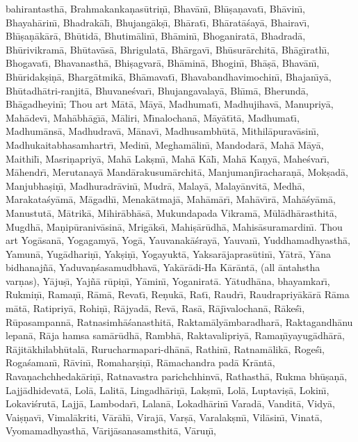 bahirantasth\=a, Brahmakanka\d{n}as\=utri\d{n}\={\i}, Bhav\=an\={\i}, Bh\={\i}\d{s}a\d{n}avat\={\i}, Bh\=avin\={\i}, Bhayah\=arin\={\i}, Bhadrak\=al\={\i}, Bhujang\=ak\d{s}\={\i}, Bh\=arat\={\i}, Bh\=arat\=a\'say\=a, Bhairav\={\i}, Bh\={\i}\d{s}a\d{n}\=ak\=ar\=a, Bh\=utid\=a, Bhutim\=alin\={\i}, Bh\=amin\={\i}, Bhoganirat\=a, Bhadrad\=a, Bh\=urivikram\=a, Bh\=utav\=as\=a, Bhrigulat\=a, Bh\=argav\={\i}, Bh\=usur\=archit\=a, Bh\=ag\={\i}rath\={\i}, Bhogavat\={\i}, Bhavanasth\=a, Bhi\d{s}agvar\=a, Bh\=amin\=a, Bhogin\={\i}, Bh\=a\d{s}\=a, Bhav\=an\={\i}, Bh\=uridak\d{s}i\d{n}\=a, Bharg\=atmik\=a, Bh\=amavat\={\i}, Bhavabandhavimochin\={\i}, Bhajan\={\i}y\=a, Bh\=utadh\=atri-ranjit\=a, Bhuvane\'svar\={\i}, Bhujangavalay\=a, Bh\={\i}m\=a, Bherund\=a, Bh\=agadheyin\={\i}; Thou art M\=at\=a, M\=ay\=a, Madhumat\={\i}, Madhujihav\=a, Manupriy\=a, Mah\=adev\={\i}, Mah\=abh\=ag\={\i}\=a, M\=aliri, M\={\i}nalochan\=a, M\=ay\=at\={\i}t\=a, Madhumat\={\i}, Madhum\=ans\=a, Madhudrav\=a, M\=anav\={\i}, Madhusambh\=ut\=a, Mithil\=apurav\=asin\={\i}, Madhukaitabhasamhartr\={\i}, Medin\={\i}, Megham\=alin\={\i}, Mandodar\=a, Mah\=a M\=ay\=a, Maithil\={\i}, Masri\d{n}apriy\=a, Mah\=a Lak\d{s}m\={\i}, Mah\=a K\=al\={\i}, Mah\=a Ka\d{n}y\=a, Mahe\'svar\={\i}, M\=ahendr\={\i}, Merutanay\=a Mand\=arakusum\=archit\=a, Manjumanj\={\i}rachara\d{n}\=a, Mok\d{s}ad\=a, Manjubha\d{s}i\d{n}\={\i}, Madhuradr\=avin\={\i}, Mudr\=a, Malay\=a, Malay\=anvit\=a, Medh\=a, Marakata\'sy\=am\=a, M\=agadh\={\i}, Menak\=atmaj\=a, Mah\=am\=ar\={\i}, Mah\=av\={\i}r\=a, Mah\=a\'sy\=am\=a, Manustut\=a, M\=atrik\=a, Mihir\=abh\=as\=a, Mukundapada Vikram\=a, M\=ul\=adh\=arasthit\=a, Mugdh\=a, Ma\d{n}ip\=uraniv\=asin\=a, Mrig\=aks\={\i}, Mahi\d{s}\=ar\=udh\=a, Mahis\=asuramardin\={\i}. Thou art Yog\=asan\=a, Yogagamy\=a, Yog\=a, Yauvanak\=a\'sray\=a, Yauvan\={\i}, Yuddhamadhyasth\=a, Yamun\=a, Yug\=adhari\d{n}\={\i}, Yak\d{s}i\d{n}\={\i}, Yogayukt\=a, Yaksar\=ajapras\=utin\={\i}, Y\=atr\=a, Y\=ana bidhanaj\~n\=a, Yaduva\d{n}\'sasamudbhav\=a, Yak\=ar\=adi-Ha K\=ar\=ant\=a, (all \=antahstha var\d{n}as), Y\=aju\d{s}\={\i}, Yaj\~n\=a r\=upi\d{n}\={\i}, Y\=amin\={\i}, Yoganirat\=a. Y\=atudh\=ana, bhayamkar\={\i}, Rukmi\d{n}\={\i}, Rama\d{n}\={\i}, R\=am\=a, Revat\={\i}, Re\d{n}uk\=a, Rat\={\i}, Raudr\={\i}, Raudrapriy\=ak\=ar\=a R\=ama m\=at\=a, Ratipriy\=a, Rohi\d{n}\={\i}, R\=ajyad\=a, Rev\=a, Ras\=a, R\=aj\={\i}valochan\=a, R\=ake\'s\={\i}, R\=upasampann\=a, Ratnasimh\=a\'sanasthit\=a, Raktam\=aly\=ambaradhar\=a, Raktagandh\=anu lepan\=a, R\=aja hamsa sam\=ar\=udh\=a, Rambh\=a, Raktavalipriy\=a, Rama\d{n}\={\i}yayug\=adh\=ar\=a, R\=ajit\=akhilabh\=utal\=a, Rurucharmapari-dh\=an\=a, Rathin\={\i}, Ratnam\=alik\=a, Roge\'s\={\i}, Roga\'saman\={\i}, R\=avin\={\i}, Romahar\d{s}i\d{n}\={\i}, R\=amachandra pad\=a Kr\=ant\=a, Rava\d{n}achchhedak\=ari\d{n}\={\i}, Ratnavastra parichchhinv\=a, Rathasth\=a, Rukma bh\=u\d{s}a\d{n}\=a, Lajj\=adhidevat\=a, Lol\=a, Lalit\=a, Lingadh\=ari\d{n}\={\i}, Lak\d{s}m\={\i}, Lol\=a, Luptavi\d{s}\=a, Lokin\={\i}, Lokavi\'srut\=a, Lajj\=a, Lambodar\={\i}, Lalan\=a, Lokadh\=arin\={\i} Varad\=a, Vandit\=a, Vidy\=a, Vai\d{s}\d{n}av\={\i}, Vimal\=akriti, V\=ar\=ah\={\i}, Viraj\=a, Var\d{s}\=a, Varalak\d{s}m\={\i}, Vil\=asin\={\i}, Vinat\=a, Vyomamadhyasth\=a, V\=arij\=asanasamsthit\=a, V\=aru\d{n}\={\i}, 